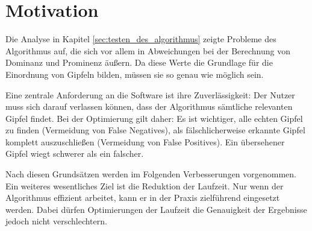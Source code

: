 \section{Motivation}\label{sec:motivation_optimierung}
Die Analyse in Kapitel \ref{sec:testen_des_algorithmus} zeigte Probleme des Algorithmus auf, die sich vor allem in Abweichungen bei der Berechnung von Dominanz und Prominenz äußern. Da diese Werte die Grundlage für die Einordnung von Gipfeln bilden, müssen sie so genau wie möglich sein.

Eine zentrale Anforderung an die Software ist ihre Zuverlässigkeit: Der Nutzer muss sich darauf verlassen können, dass der Algorithmus sämtliche relevanten Gipfel findet. Bei der Optimierung gilt daher: Es ist wichtiger, alle echten Gipfel zu finden (Vermeidung von False Negatives), als fälschlicherweise erkannte Gipfel komplett auszuschließen (Vermeidung von False Positives). Ein übersehener Gipfel wiegt schwerer als ein falscher.

Nach diesen Grundsätzen werden im Folgenden Verbesserungen vorgenommen. Ein weiteres wesentliches Ziel ist die Reduktion der Laufzeit. Nur wenn der Algorithmus effizient arbeitet, kann er in der Praxis zielführend eingesetzt werden. Dabei dürfen Optimierungen der Laufzeit die Genauigkeit der Ergebnisse jedoch nicht verschlechtern. 